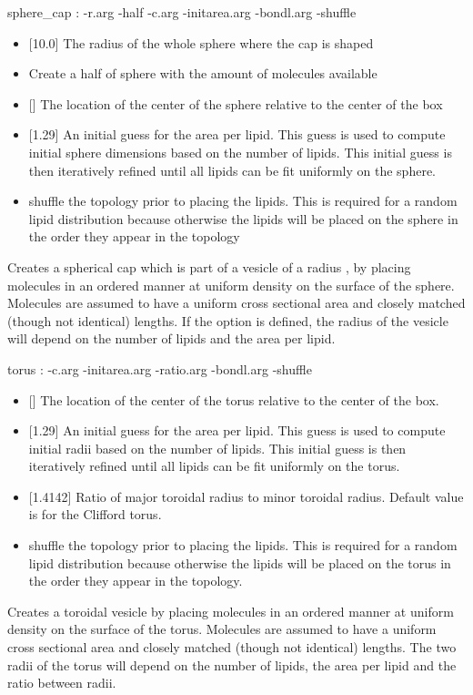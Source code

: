 \begin{code}
  sphere_cap : -r.arg -half -c.arg -initarea.arg -bondl.arg -shuffle
\end{code}
\begin{itemize}
\item {} [10.0] The radius of the whole sphere where the cap is
  shaped
\item {} Create a half of sphere with the amount of molecules
  available
\item {} [] The location of the center
  of the sphere relative to the center of the box
\item {} [1.29] An initial guess for the area per
  lipid. This guess is used to compute initial sphere dimensions based
  on the number of lipids. This initial guess is then iteratively
  refined until all lipids can be fit uniformly on the sphere.
\item {} shuffle the topology prior to placing the
  lipids. This is required for a random lipid distribution because
  otherwise the lipids will be placed on the sphere in the order they
  appear in the topology
\end{itemize}
Creates a spherical cap which is part of a vesicle of a radius
, by placing molecules in an ordered manner at uniform density
on the surface of the sphere. Molecules are assumed to have a uniform
cross sectional area and closely matched (though not identical)
lengths. If the option  is defined, the radius of the
vesicle will depend on the number of lipids and the area per lipid.


\begin{code}
  torus : -c.arg -initarea.arg -ratio.arg -bondl.arg -shuffle
\end{code}
\begin{itemize}
\item {} [] The location of the center
  of the torus relative to the center of the box.
\item {} [1.29] An initial guess for the area per
  lipid. This guess is used to compute initial radii based on the
  number of lipids. This initial guess is then iteratively refined
  until all lipids can be fit uniformly on the torus.
\item {} [1.4142] Ratio of major toroidal radius to minor
  toroidal radius. Default value is for the Clifford torus.
\item {} shuffle the topology prior to placing the
  lipids. This is required for a random lipid distribution because
  otherwise the lipids will be placed on the torus in the order they
  appear in the topology.
\end{itemize}
Creates a toroidal vesicle by placing molecules in an ordered manner
at uniform density on the surface of the torus. Molecules are assumed
to have a uniform cross sectional area and closely matched (though not
identical) lengths. The two radii of the torus will depend on the
number of lipids, the area per lipid and the ratio between radii.



